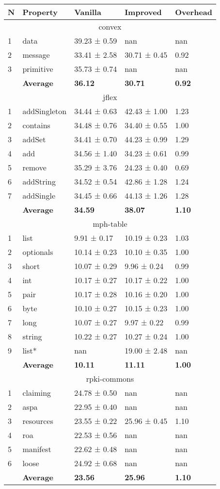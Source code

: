 \begin{tabular}{lllll}
N & Property & Vanilla & Improved & Overhead \\
\hline
\multicolumn{5}{c}{convex} \\
\hline
1 & data & 39.23 ± 0.59 & nan & nan \\
2 & message & 33.41 ± 2.58 & 30.71 ± 0.45 & 0.92 \\
3 & primitive & 35.73 ± 0.74 & nan & nan \\
\textbf{} & \textbf{Average} & \textbf{36.12} & \textbf{30.71} & \textbf{0.92} \\
\hline
\multicolumn{5}{c}{jflex} \\
\hline
1 & addSingleton & 34.44 ± 0.63 & 42.43 ± 1.00 & 1.23 \\
2 & contains & 34.48 ± 0.76 & 34.40 ± 0.55 & 1.00 \\
3 & addSet & 34.41 ± 0.70 & 44.23 ± 0.99 & 1.29 \\
4 & add & 34.56 ± 1.40 & 34.23 ± 0.61 & 0.99 \\
5 & remove & 35.29 ± 3.76 & 24.23 ± 0.40 & 0.69 \\
6 & addString & 34.52 ± 0.54 & 42.86 ± 1.28 & 1.24 \\
7 & addSingle & 34.45 ± 0.66 & 44.13 ± 1.26 & 1.28 \\
\textbf{} & \textbf{Average} & \textbf{34.59} & \textbf{38.07} & \textbf{1.10} \\
\hline
\multicolumn{5}{c}{mph-table} \\
\hline
1 & list & 9.91 ± 0.17 & 10.19 ± 0.23 & 1.03 \\
2 & optionals & 10.14 ± 0.23 & 10.10 ± 0.35 & 1.00 \\
3 & short & 10.07 ± 0.29 & 9.96 ± 0.24 & 0.99 \\
4 & int & 10.17 ± 0.27 & 10.17 ± 0.22 & 1.00 \\
5 & pair & 10.17 ± 0.28 & 10.16 ± 0.20 & 1.00 \\
6 & byte & 10.10 ± 0.27 & 10.15 ± 0.23 & 1.00 \\
7 & long & 10.07 ± 0.27 & 9.97 ± 0.22 & 0.99 \\
8 & string & 10.22 ± 0.27 & 10.27 ± 0.24 & 1.00 \\
9 & list* & nan & 19.00 ± 2.48 & nan \\
\textbf{} & \textbf{Average} & \textbf{10.11} & \textbf{11.11} & \textbf{1.00} \\
\hline
\multicolumn{5}{c}{rpki-commons} \\
\hline
1 & claiming & 24.78 ± 0.50 & nan & nan \\
2 & aspa & 22.95 ± 0.40 & nan & nan \\
3 & resources & 23.55 ± 0.22 & 25.96 ± 0.45 & 1.10 \\
4 & roa & 22.53 ± 0.56 & nan & nan \\
5 & manifest & 22.62 ± 0.48 & nan & nan \\
6 & loose & 24.92 ± 0.68 & nan & nan \\
\textbf{} & \textbf{Average} & \textbf{23.56} & \textbf{25.96} & \textbf{1.10} \\
\end{tabular}
